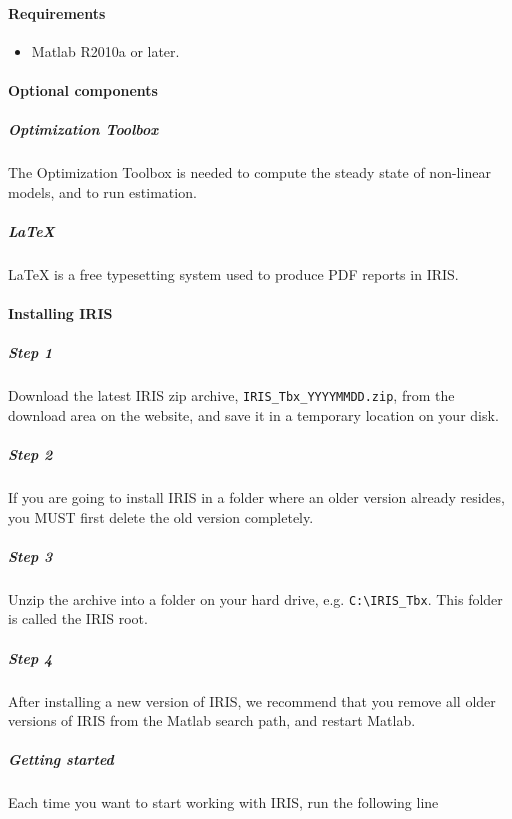 

	\paragraph{Requirements}
 
 \begin{itemize}
 \item
   Matlab R2010a or later.
 \end{itemize}
 
 \paragraph{Optional components}
 
 \subparagraph{Optimization Toolbox}
 
 The Optimization Toolbox is needed to compute the steady state of
 non-linear models, and to run estimation.
 
 \subparagraph{LaTeX}
 
 LaTeX is a free typesetting system used to produce PDF reports in IRIS.
 
 \paragraph{Installing IRIS}
 
 \subparagraph{Step 1}
 
 Download the latest IRIS zip archive, \texttt{IRIS\_Tbx\_YYYYMMDD.zip},
 from the download area on the website, and save it in a temporary
 location on your disk.
 
 \subparagraph{Step 2}
 
 If you are going to install IRIS in a folder where an older version
 already resides, you MUST first delete the old version completely.
 
 \subparagraph{Step 3}
 
 Unzip the archive into a folder on your hard drive, e.g.
 \texttt{C:\textbackslash{}IRIS\_Tbx}. This folder is called the IRIS
 root.
 
 \subparagraph{Step 4}
 
 After installing a new version of IRIS, we recommend that you remove all
 older versions of IRIS from the Matlab search path, and restart Matlab.
 
 \subparagraph{Getting started}
 
 Each time you want to start working with IRIS, run the following line
 
